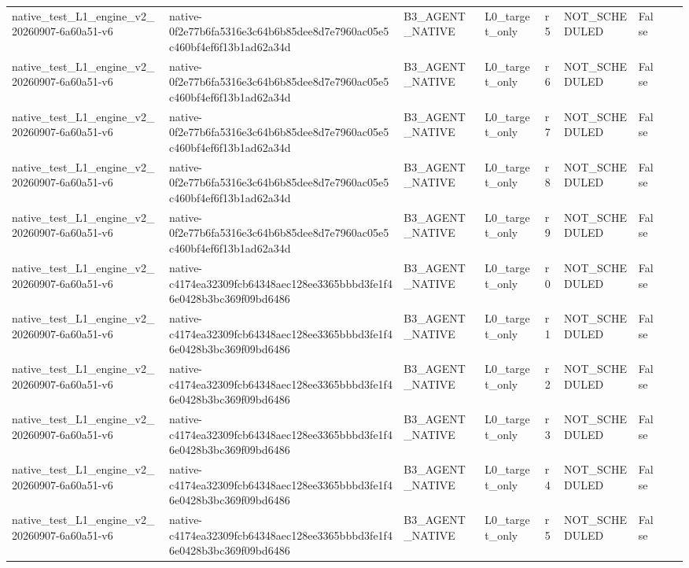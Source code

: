 \begin{tabular}{lllllllll}
native\_test\_L1\_engine\_v2\_20260907-6a60a51-v6 & native-0f2e77b6fa5316e3c64b6b85dee8d7e7960ac05e5c460bf4ef6f13b1ad62a34d & B3\_AGENT\_NATIVE & L0\_target\_only & r5 & NOT\_SCHEDULED & False &  &  \\
native\_test\_L1\_engine\_v2\_20260907-6a60a51-v6 & native-0f2e77b6fa5316e3c64b6b85dee8d7e7960ac05e5c460bf4ef6f13b1ad62a34d & B3\_AGENT\_NATIVE & L0\_target\_only & r6 & NOT\_SCHEDULED & False &  &  \\
native\_test\_L1\_engine\_v2\_20260907-6a60a51-v6 & native-0f2e77b6fa5316e3c64b6b85dee8d7e7960ac05e5c460bf4ef6f13b1ad62a34d & B3\_AGENT\_NATIVE & L0\_target\_only & r7 & NOT\_SCHEDULED & False &  &  \\
native\_test\_L1\_engine\_v2\_20260907-6a60a51-v6 & native-0f2e77b6fa5316e3c64b6b85dee8d7e7960ac05e5c460bf4ef6f13b1ad62a34d & B3\_AGENT\_NATIVE & L0\_target\_only & r8 & NOT\_SCHEDULED & False &  &  \\
native\_test\_L1\_engine\_v2\_20260907-6a60a51-v6 & native-0f2e77b6fa5316e3c64b6b85dee8d7e7960ac05e5c460bf4ef6f13b1ad62a34d & B3\_AGENT\_NATIVE & L0\_target\_only & r9 & NOT\_SCHEDULED & False &  &  \\
native\_test\_L1\_engine\_v2\_20260907-6a60a51-v6 & native-c4174ea32309fcb64348aec128ee3365bbbd3fe1f46e0428b3bc369f09bd6486 & B3\_AGENT\_NATIVE & L0\_target\_only & r0 & NOT\_SCHEDULED & False &  &  \\
native\_test\_L1\_engine\_v2\_20260907-6a60a51-v6 & native-c4174ea32309fcb64348aec128ee3365bbbd3fe1f46e0428b3bc369f09bd6486 & B3\_AGENT\_NATIVE & L0\_target\_only & r1 & NOT\_SCHEDULED & False &  &  \\
native\_test\_L1\_engine\_v2\_20260907-6a60a51-v6 & native-c4174ea32309fcb64348aec128ee3365bbbd3fe1f46e0428b3bc369f09bd6486 & B3\_AGENT\_NATIVE & L0\_target\_only & r2 & NOT\_SCHEDULED & False &  &  \\
native\_test\_L1\_engine\_v2\_20260907-6a60a51-v6 & native-c4174ea32309fcb64348aec128ee3365bbbd3fe1f46e0428b3bc369f09bd6486 & B3\_AGENT\_NATIVE & L0\_target\_only & r3 & NOT\_SCHEDULED & False &  &  \\
native\_test\_L1\_engine\_v2\_20260907-6a60a51-v6 & native-c4174ea32309fcb64348aec128ee3365bbbd3fe1f46e0428b3bc369f09bd6486 & B3\_AGENT\_NATIVE & L0\_target\_only & r4 & NOT\_SCHEDULED & False &  &  \\
native\_test\_L1\_engine\_v2\_20260907-6a60a51-v6 & native-c4174ea32309fcb64348aec128ee3365bbbd3fe1f46e0428b3bc369f09bd6486 & B3\_AGENT\_NATIVE & L0\_target\_only & r5 & NOT\_SCHEDULED & False &  &  \\

\end{tabular}
